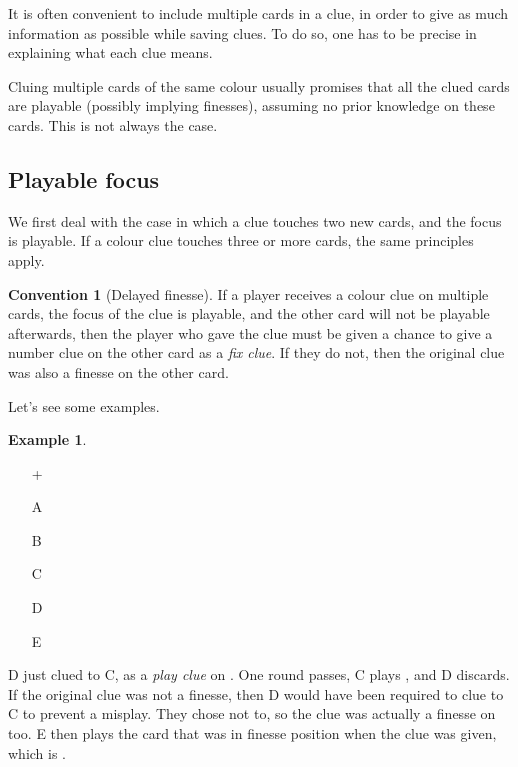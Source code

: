 \documentclass[a4paper]{article}
\theoremstyle{plain}
\theoremstyle{definition}
\newtheorem{example}[theorem]{Example}
\newtheorem{convention}[theorem]{Convention}
\begin{document}
It is often convenient to include multiple cards in a clue, in order to give as much information as possible while saving clues. To do so, one has to be precise in explaining what each clue means.

Cluing multiple cards of the same colour usually promises that all the clued cards are playable (possibly implying finesses), assuming no prior knowledge on these cards. This is not always the case.

\subsection{Playable focus}

We first deal with the case in which a clue touches two new cards, and the focus is playable. If a colour clue touches three or more cards, the same principles apply.

\begin{convention}[Delayed finesse]
	\label{delayed-finesse}
	If a player receives a colour clue on multiple cards, the focus of the clue is playable, and the other card will not be playable afterwards, then the player who gave the clue must be given a chance to give a number clue on the other card as a \emph{fix clue}. If they do not, then the original clue was also a finesse on the other card.
\end{convention}

Let's see some examples.

\begin{example}	\hfill \\
	\begin{minipage}{0.45\textwidth}
		\begin{itemize}
			\item[\Large +]      
			\item[\Large A]    
			\item[\Large B]    
			\item[\Large C]    
			\item[\Large D]    
			\item[\Large E]    
		\end{itemize}
	\end{minipage}%
	\begin{minipage}{0.55\textwidth}
		D just clued  to C, as a \emph{play clue} on . One round passes, C plays , and D discards. If the original  clue was not a finesse, then D would have been required to clue  to C to prevent a misplay. They chose not to, so the clue was actually a finesse on  too. E then plays the card that was in finesse position when the  clue was given, which is .
	\end{minipage}
\end{example} \vspace{0.15 cm}
\end{document}
